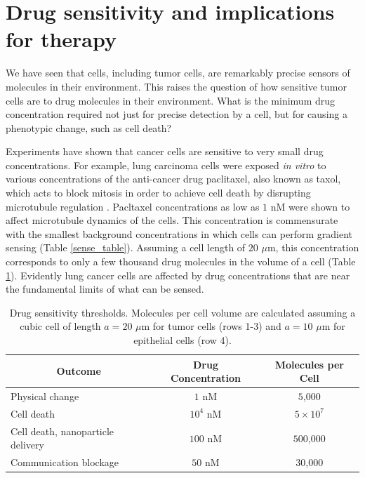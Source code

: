 \section{Drug sensitivity and implications for therapy}

We have seen that cells, including tumor cells, are remarkably precise sensors of molecules in their environment. This raises the question of how sensitive tumor cells are to drug molecules in their environment. What is the minimum drug concentration required not just for precise detection by a cell, but for causing a phenotypic change, such as cell death?

Experiments have shown that cancer cells are sensitive to very small drug concentrations. For example, lung carcinoma cells were exposed \textit{in vitro} to various concentrations of the anti-cancer drug paclitaxel, also known as taxol, which acts to block mitosis in order to achieve cell death by disrupting microtubule regulation \cite{torres1998mechanisms}. Pacltaxel concentrations as low as $1$ nM were shown to affect microtubule dynamics of the cells. This concentration is commensurate with the smallest background concentrations in which cells can perform gradient sensing (Table \ref{sense_table}). Assuming a cell length of $20$ $\mu$m, this concentration corresponds to only a few thousand drug molecules in the volume of a cell (Table \ref{drug_table}). Evidently lung cancer cells are affected by drug concentrations that are near the fundamental limits of what can be sensed.



\begin{table}[t]
\begin{center}
    \begin{tabular}{ |l|c|c| }
        \hline
        \multicolumn{1}{|c|}{Outcome} & Drug Concentration & Molecules per Cell \\ \hline
        Physical change \cite{torres1998mechanisms} & $1$ nM & $5$,$000$ \\ \hline
        Cell death \cite{grantab2006penetration} & $10^4$ nM & $5\times 10^7$ \\ \hline
        Cell death, nanoparticle delivery \cite{malam2009liposomes} & $100$ nM & $500$,$000$ \\ \hline
        Communication blockage \cite{ellison2016cell} & $50$ nM & $30$,$000$ \\ \hline
    \end{tabular}
\caption{Drug sensitivity thresholds. Molecules per cell volume are calculated assuming a cubic cell of length $a = 20$ $\mu$m for tumor cells (rows 1-3) and $a = 10$ $\mu$m for epithelial cells (row 4).}
\label{drug_table}
\end{center}
\end{table}



